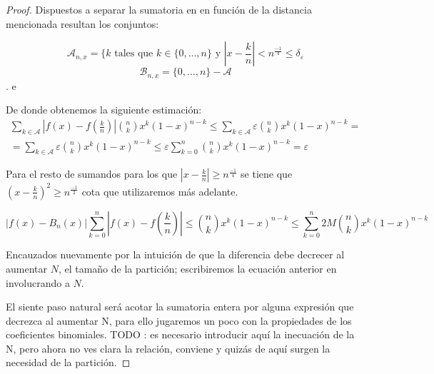 \begin{proof}
    Dispuestos a separar la sumatoria en en función de la  distancia mencionada resultan los conjuntos: 

     $$\mathcal{A}_{n,x} = \{ k \text{ tales que } k \in \{0,..., n\} \text{ y  } |x - \frac{k}{n}| < n^{\frac{-1}{4}} \leq \delta_\varepsilon$$
     $$\mathcal{B}_{n,x} = \{0,..., n\} - \mathcal{A}$$. e

     De donde obtenemos la siguiente estimación: 
     \begin{equation*}
        \begin{split}
        \sum_{k \in \mathcal A } \left|f(x) - f \left( \frac{k}{n} \right)\right|
     \binom{n}{k} x^{k} (1-x)^{n-k}
     \leq 
     \sum_{k \in \mathcal A } \varepsilon \binom{n}{k} x^{k} (1-x)^{n-k} 
     =  \\
      = \sum_{k \in \mathcal A } \varepsilon \binom{n}{k} x^{k} (1-x)^{n-k} 
     \leq 
     \varepsilon \sum_{k = 0} ^ n  \binom{n}{k} x^{k} (1-x)^{n-k} = 
     \varepsilon
        \end{split}
    \end{equation*}

    Para el resto de sumandos para los que $|x - \frac{k}{n}| \geq  n^{\frac{-1}{4}}$ se tiene que 
    $(x - \frac{k}{n})^2 \geq  n^{\frac{-1}{2}}$ cota que utilizaremos más adelante. 

    \begin{equation*}
        |f(x)-B_n(x)| \sum_{k=0}^n \left|f(x) - f \left( \frac{k}{n} \right)\right| \leq
     \binom{n}{k} x^{k} (1-x)^{n-k}
     \leq \sum_{k=0}^n 2M 
    \binom{n}{k} x^{k} (1-x)^{n-k}
    \end{equation*}


    Encauzados nuevamente por la intuición de que la diferencia debe decrecer al aumentar $N$,
     el tamaño de la partición;
    escribiremos la ecuación anterior en involucrando a $N$. 



    El siente paso natural será acotar la sumatoria entera por alguna expresión que decrezca al aumentar N, para ello jugaremos un poco con la propiedades de los coeficientes binomiales. 
    TODO : es necesario introducir aquí la inecuación de la N, pero ahora no ves clara la relación, conviene 
    y quizás de aquí surgen la necesidad de la partición. 
   


\end{proof}
